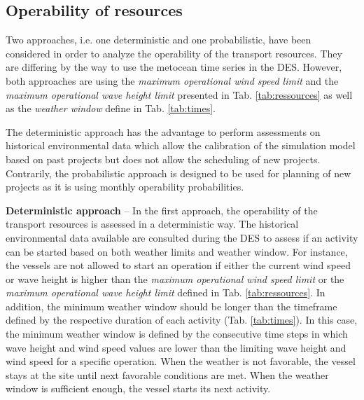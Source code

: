 \subsection{Operability of resources}
Two approaches, i.e. one deterministic and one probabilistic, have been considered in order to analyze the operability of the transport resources. They are differing by the way to use the metocean time series in the DES. However, both approaches are using the \textit{maximum operational wind speed limit} and the \textit{maximum operational wave height limit} presented in Tab. \ref{tab:ressources} as well as the \textit{weather window} define in Tab. \ref{tab:times}.

The deterministic approach has the advantage to perform assessments on historical environmental data which allow the calibration of the simulation model based on past projects but does not allow the scheduling of new projects. Contrarily, the probabilistic approach is designed to be used for planning of new projects as it is using monthly operability probabilities. %

\textbf{Deterministic approach} -- In the first approach, the operability of the transport resources is assessed in a deterministic way. The historical environmental data available are consulted during the DES to assess if an activity can be started based on both weather limits and weather window. For instance, the vessels are not allowed to start an operation if either the current wind speed or wave height is higher than the \textit{maximum operational wind speed limit} or the \textit{maximum operational wave height limit} defined in Tab. \ref{tab:ressources}. In addition, the minimum weather window should be longer than the timeframe defined by the respective duration of each activity (Tab. \ref{tab:times}). In this case, the minimum weather window is defined by the consecutive time steps in which wave height and wind speed values are lower than the limiting wave height and wind speed for a specific operation. When the weather is not favorable, the vessel stays at the site until next favorable conditions are met. When the weather window is sufficient enough, the vessel starts its next activity. 

